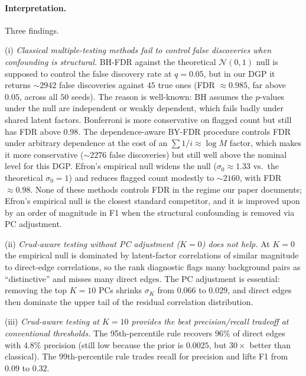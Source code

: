 \paragraph{Interpretation.} Three findings.

(i) \emph{Classical multiple-testing methods fail to control false discoveries when confounding is structural.} BH-FDR against the theoretical $\mathcal{N}(0,1)$ null is supposed to control the false discovery rate at $q=0.05$, but in our DGP it returns $\sim$$2942$ false discoveries against $45$ true ones (FDR $\approx 0.985$, far above $0.05$, across all $50$ seeds). The reason is well-known: BH assumes the $p$-values under the null are independent or weakly dependent, which fails badly under shared latent factors. Bonferroni is more conservative on flagged count but still has FDR above $0.98$. The dependence-aware BY-FDR procedure controls FDR under arbitrary dependence at the cost of an $\sum 1/i\approx \log M$ factor, which makes it more conservative ($\sim$$2276$ false discoveries) but still well above the nominal level for this DGP. Efron's empirical null \citep{efron2004} widens the null ($\sigma_0\approx 1.33$ vs.\ the theoretical $\sigma_0=1$) and reduces flagged count modestly to $\sim$$2160$, with FDR $\approx 0.98$. None of these methods controls FDR in the regime our paper documents; Efron's empirical null is the closest standard competitor, and it is improved upon by an order of magnitude in F1 when the structural confounding is removed via PC adjustment.

(ii) \emph{Crud-aware testing without PC adjustment ($K=0$) does not help.} At $K=0$ the empirical null is dominated by latent-factor correlations of similar magnitude to direct-edge correlations, so the rank diagnostic flags many background pairs as ``distinctive'' and misses many direct edges. The PC adjustment is essential: removing the top $K=10$ PCs shrinks $\sigma_K$ from $0.066$ to $0.029$, and direct edges then dominate the upper tail of the residual correlation distribution.

(iii) \emph{Crud-aware testing at $K=10$ provides the best precision/recall tradeoff at conventional thresholds.} The 95th-percentile rule recovers $96\%$ of direct edges with $4.8\%$ precision (still low because the prior is $0.0025$, but $30\times$ better than classical). The 99th-percentile rule trades recall for precision and lifts F1 from $0.09$ to $0.32$.

